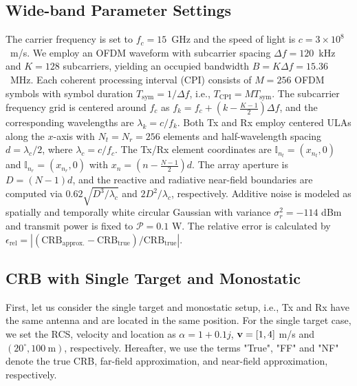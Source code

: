 \documentclass[9pt,final,journal,twocolumn]{IEEEtran}
\begin{document}
\subsection{Wide-band Parameter Settings}
\vspace{-0.1cm} 
The carrier frequency is set to $f_c=15$~GHz and the speed of light is $c=3\times 10^8$~m/s. We employ an OFDM waveform with subcarrier spacing $\Delta f=120$~kHz and $K=128$ subcarriers, yielding an occupied bandwidth $B=K\Delta f=15.36$~MHz. Each coherent processing interval (CPI) consists of $M=256$ OFDM symbols with symbol duration $T_{\mathrm{sym}}=1/\Delta f$, i.e., $T_{\mathrm{CPI}}=MT_{\mathrm{sym}}$. The subcarrier frequency grid is centered around $f_c$ as $f_k=f_c+\left(k-\frac{K-1}{2}\right)\Delta f$, and the corresponding wavelengths are $\lambda_k=c/f_k$.
Both Tx and Rx employ centered ULAs along the $x$-axis with $N_t=N_r=256$ elements and half-wavelength spacing $d=\lambda_c/2$, where $\lambda_c=c/f_c$. The Tx/Rx element coordinates are ${\mathbb I}_{n_t}=(x_{n_t},0)$ and ${\mathbb I}_{n_r}=(x_{n_r},0)$ with $x_{n}=\left(n-\frac{N-1}{2}\right)d$. The array aperture is $D=(N-1)d$, and the reactive and radiative near-field boundaries are computed via $0.62\sqrt{D^3/\lambda_c}$ and $2D^2/\lambda_c$, respectively. Additive noise is modeled as spatially and temporally white circular Gaussian with variance ${\sigma}_r^2 = -114$ dBm and transmit power is fixed to $\mathcal{P}=0.1$ W. The relative error is calculated by $\epsilon_{\mathrm{rel}} =\left|\left(\mathrm{CRB}_{\mathrm{approx.}}-\mathrm{CRB}_{\mathrm{true}}\right)/\mathrm{CRB}_{\mathrm{true}}\right|$.

\vspace{-0.2cm}
\subsection{CRB with Single Target and Monostatic}
\vspace{-0.1cm}
First, let us consider the single target and monostatic setup, i.e., Tx and Rx have the same antenna and are located in the same position. 
For the single target case, we set the RCS, velocity and location as ${\alpha}=1+0.1j$,  ${\bf v}=[1,4]$ m/s and $(20^\circ,100~\mathrm{m})$, respectively.  Hereafter, we use the terms "True", "FF" and "NF" denote the true CRB, far-field approximation, and near-field approximation, respectively.   
\end{document}
